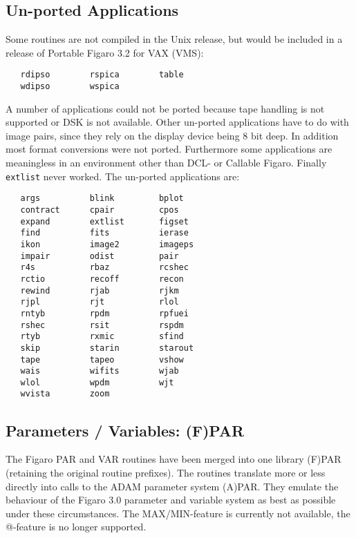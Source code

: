 \subsection{Un-ported Applications}

Some routines are not compiled in the Unix release, but would be
included in a release of Portable Figaro 3.2 for VAX (VMS):

\begin{verbatim}
   rdipso        rspica        table    
   wdipso        wspica
\end{verbatim}

A number of applications could not be ported because tape handling is
not supported or DSK is not available.  Other un-ported applications
have to do with image pairs, since they rely on the display device being
8 bit deep.  In addition most format conversions were not ported.
Furthermore some applications are meaningless in an environment other
than DCL- or Callable Figaro.  Finally {\tt extlist} never worked.
The un-ported applications are:

\begin{verbatim}
   args          blink         bplot    
   contract      cpair         cpos     
   expand        extlist       figset   
   find          fits          ierase   
   ikon          image2        imageps  
   impair        odist         pair     
   r4s           rbaz          rcshec   
   rctio         recoff        recon    
   rewind        rjab          rjkm     
   rjpl          rjt           rlol     
   rntyb         rpdm          rpfuei   
   rshec         rsit          rspdm    
   rtyb          rxmic         sfind    
   skip          starin        starout  
   tape          tapeo         vshow
   wais          wifits        wjab     
   wlol          wpdm          wjt      
   wvista        zoom     
\end{verbatim}


\subsection{Parameters / Variables: (F)PAR}

The Figaro PAR and VAR routines have been merged into one library (F)PAR
(retaining the original routine prefixes). The routines translate more
or less directly into calls to the ADAM parameter system (A)PAR. They
emulate the behaviour of the Figaro 3.0 parameter and variable system as
best as possible under these circumstances. The MAX/MIN-feature is
currently not available, the @-feature is no longer supported.


